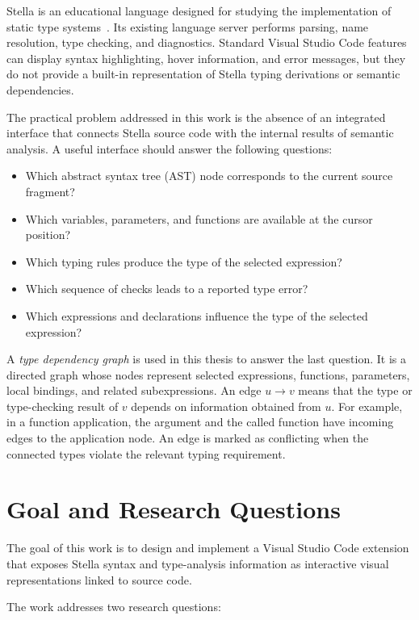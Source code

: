 Stella is an educational language designed for studying the implementation of static type systems~\cite{Abounegm2024Stella}. Its existing language server performs parsing, name resolution, type checking, and diagnostics. Standard Visual Studio Code features can display syntax highlighting, hover information, and error messages, but they do not provide a built-in representation of Stella typing derivations or semantic dependencies.

The practical problem addressed in this work is the absence of an integrated interface that connects Stella source code with the internal results of semantic analysis. A useful interface should answer the following questions:

\begin{itemize}
    \item Which abstract syntax tree (AST) node corresponds to the current source fragment?
    \item Which variables, parameters, and functions are available at the cursor position?
    \item Which typing rules produce the type of the selected expression?
    \item Which sequence of checks leads to a reported type error?
    \item Which expressions and declarations influence the type of the selected expression?
\end{itemize}

A \emph{type dependency graph} is used in this thesis to answer the last question. It is a directed graph whose nodes represent selected expressions, functions, parameters, local bindings, and related subexpressions. An edge $u \rightarrow v$ means that the type or type-checking result of $v$ depends on information obtained from $u$. For example, in a function application, the argument and the called function have incoming edges to the application node. An edge is marked as conflicting when the connected types violate the relevant typing requirement.

\section{Goal and Research Questions}

The goal of this work is to design and implement a Visual Studio Code extension that exposes Stella syntax and type-analysis information as interactive visual representations linked to source code.

The work addresses two research questions:

